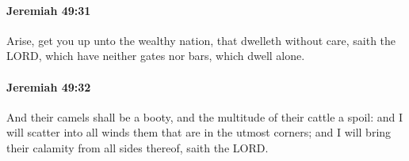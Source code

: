 		\paragraph{Jeremiah 49:31} %
			\label{JEREMIAH-49-31}

			Arise, get you up unto the wealthy nation, that dwelleth without care, saith the LORD, which have neither gates nor bars, which dwell alone.


		\paragraph{Jeremiah 49:32} %
			\label{JEREMIAH-49-32}

			And their camels shall be a booty, and the multitude of their cattle a spoil: and I will scatter into all winds them that are in the utmost corners; and I will bring their calamity from all sides thereof, saith the LORD.

